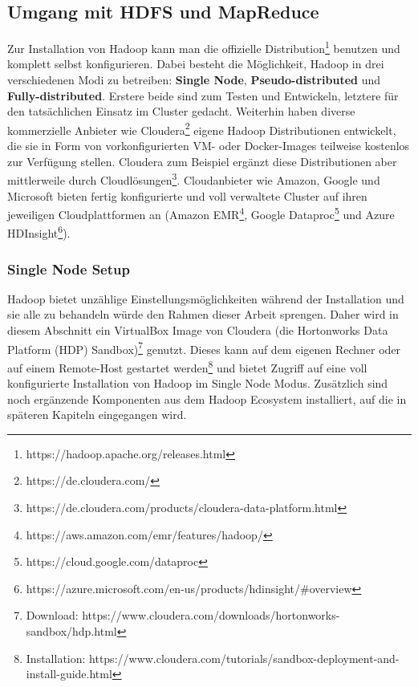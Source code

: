 \subsection{Umgang mit HDFS und MapReduce}
Zur Installation von Hadoop kann man die offizielle Distribution\footnote{https://hadoop.apache.org/releases.html} benutzen und komplett selbst konfigurieren. Dabei besteht die Möglichkeit, Hadoop in drei verschiedenen Modi zu betreiben: \textbf{Single Node}, \textbf{Pseudo-distributed} und \textbf{Fully-distributed}. Erstere beide sind zum Testen und Entwickeln, letztere für den tatsächlichen Einsatz im Cluster gedacht\cite[vgl.][Kap. 3.4]{freiknecht_big_2018}.
Weiterhin haben diverse kommerzielle Anbieter wie Cloudera\footnote{https://de.cloudera.com/} eigene Hadoop Distributionen entwickelt, die sie in Form von vorkonfigurierten VM- oder Docker-Images teilweise kostenlos zur Verfügung stellen. Cloudera zum Beispiel ergänzt diese Distributionen aber mittlerweile durch Cloudlösungen\footnote{https://de.cloudera.com/products/cloudera-data-platform.html}.   
Cloudanbieter wie Amazon, Google und Microsoft bieten fertig konfigurierte und voll verwaltete Cluster auf ihren jeweiligen Cloudplattformen an (Amazon EMR\footnote{https://aws.amazon.com/emr/features/hadoop/}, Google Dataproc\footnote{https://cloud.google.com/dataproc} und Azure HDInsight\footnote{https://azure.microsoft.com/en-us/products/hdinsight/\#overview}). 

\subsubsection*{Single Node Setup}
Hadoop bietet unzählige Einstellungsmöglichkeiten während der Installation und sie alle zu behandeln würde den Rahmen dieser Arbeit sprengen. Daher wird in diesem Abschnitt ein VirtualBox Image von Cloudera (die Hortonworks Data Platform (HDP) Sandbox)\footnote{Download: https://www.cloudera.com/downloads/hortonworks-sandbox/hdp.html} genutzt. Dieses kann auf dem eigenen Rechner oder auf einem Remote-Host gestartet werden\footnote{Installation: https://www.cloudera.com/tutorials/sandbox-deployment-and-install-guide.html} und bietet Zugriff auf eine voll konfigurierte Installation von Hadoop im Single Node Modus. Zusätzlich sind noch ergänzende Komponenten aus dem Hadoop Ecosystem installiert, auf die in späteren Kapiteln eingegangen wird.\par

